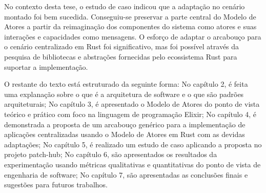 No contexto desta tese, o estudo de caso indicou que a adaptação no cenário montado foi bem sucedida. Conseguiu-se preservar a parte central do Modelo de Atores a partir da reimaginação dos componentes do sistema como atores e suas interações e capacidades como mensagens. O esforço de adaptar o arcabouço para o cenário centralizado em Rust foi significativo, mas foi possível através da pesquisa de bibliotecas e abstrações fornecidas pelo ecossistema Rust para suportar a implementação.

O restante do texto está estruturado da seguinte forma: No capítulo 2, é feita uma explanação sobre o que é a arquitetura de software e o que são padrões arquiteturais; No capítulo 3, é apresentado o Modelo de Atores do ponto de vista teórico e prático com foco na linguagem de programação Elixir; No capítulo 4, é demonstrada a proposta de um arcabouço genérico para a implementação de aplicações centralizadas usando o Modelo de Atores em Rust com as devidas adaptações; No capítulo 5, é realizado um estudo de caso aplicando a proposta no projeto patch-hub; No capítulo 6, são apresentados os resultados da experimentação usando métricas qualitativas e quantitativas do ponto de vista de engenharia de software; No capítulo 7, são apresentadas as conclusões finais e sugestões para futuros trabalhos.
